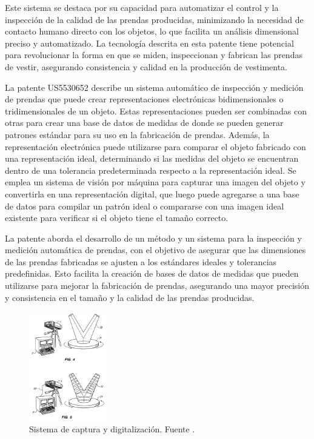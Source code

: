 Este sistema se destaca por su capacidad para automatizar el control y la inspección de la calidad de las prendas producidas, minimizando la necesidad de contacto humano directo con los objetos, lo que facilita un análisis dimensional preciso y automatizado. La tecnología descrita en esta patente tiene potencial para revolucionar la forma en que se miden, inspeccionan y fabrican las prendas de vestir, asegurando consistencia y calidad en la producción de vestimenta.

La patente US5530652 describe un sistema automático de inspección y medición de prendas que puede crear representaciones electrónicas bidimensionales o tridimensionales de un objeto. Estas representaciones pueden ser combinadas con otras para crear una base de datos de medidas de donde se pueden generar patrones estándar para su uso en la fabricación de prendas. Además, la representación electrónica puede utilizarse para comparar el objeto fabricado con una representación ideal, determinando si las medidas del objeto se encuentran dentro de una tolerancia predeterminada respecto a la representación ideal. Se emplea un sistema de visión por máquina para capturar una imagen del objeto y convertirla en una representación digital, que luego puede agregarse a una base de datos para compilar un patrón ideal o compararse con una imagen ideal existente para verificar si el objeto tiene el tamaño correcto.

La patente aborda el desarrollo de un método y un sistema para la inspección y medición automática de prendas, con el objetivo de asegurar que las dimensiones de las prendas fabricadas se ajusten a los estándares ideales y tolerancias predefinidas. Esto facilita la creación de bases de datos de medidas que pueden utilizarse para mejorar la fabricación de prendas, asegurando una mayor precisión y consistencia en el tamaño y la calidad de las prendas producidas.

\begin{figure}[H]
	\centering
	\includegraphics[width=0.3\textwidth]{img/US5530652-drawings-page-7.png}
	\caption[Sistema de captura y digitalización.]{Sistema de captura y digitalización. Fuente \cite{US5530652A}.}
	\label{fig:US5530652-7}
\end{figure}

